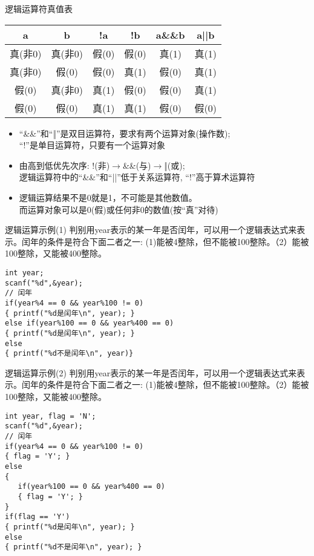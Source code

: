 \begin{frame}{逻辑运算符真值表}
\centering
\begin{tabular}{|c|c||c|c|c|c|}
\hline 
a       & b      & !a    & !b    & a\&\&b & a||b \\ 
\hline 
真(非0) & 真(非0) & 假(0) & 假(0) & 真(1)  & 真(1) \\ 
\hline
真(非0) & 假(0)   & 假(0) & 真(1) & 假(0)  & 真(1) \\ 
\hline 
假(0)   & 真(非0) & 真(1) & 假(0) & 假(0)  & 真(1) \\ 
\hline 
假(0)   & 假(0)   & 真(1) & 真(1) & 假(0)  & 假(0) \\ 
\hline  
\end{tabular} 
\begin{itemize}
	\item ``\&\&''和``‖''是双目运算符，要求有两个运算对象(操作数);\\ ``!''是单目运算符，只要有一个运算对象
	\item 由高到低优先次序: !(非)$\to$\&\&(与)$\to$‖(或);\\
          逻辑运算符中的``\&\&''和``||''低于关系运算符, ``!''高于算术运算符
	\item 逻辑运算结果不是0就是1，不可能是其他数值。\\
	      而运算对象可以是0(假)或任何非0的数值(按``真''对待)
\end{itemize}
\end{frame}

\begin{frame}{逻辑运算示例(1)}
判别用year表示的某一年是否闰年，可以用一个逻辑表达式来表示。闰年的条件是符合下面二者之一: (1)能被4整除，但不能被100整除。（2）能被100整除，又能被400整除。
\begin{lstlisting}
int year;
scanf("%d",&year);
// 闰年
if(year%4 == 0 && year%100 != 0)
{ printf("%d是闰年\n", year); }
else if(year%100 == 0 && year%400 == 0)
{ printf("%d是闰年\n", year); }
else
{ printf("%d不是闰年\n", year)}
\end{lstlisting}
\end{frame}

\begin{frame}{逻辑运算示例(2)}
判别用year表示的某一年是否闰年，可以用一个逻辑表达式来表示。闰年的条件是符合下面二者之一: (1)能被4整除，但不能被100整除。（2）能被100整除，又能被400整除。
\begin{lstlisting}
int year, flag = 'N';
scanf("%d",&year);
// 闰年
if(year%4 == 0 && year%100 != 0)
{ flag = 'Y'; }
else
{ 
   if(year%100 == 0 && year%400 == 0)
   { flag = 'Y'; }
}
if(flag == 'Y') 
{ printf("%d是闰年\n", year); }
else
{ printf("%d不是闰年\n", year); }
\end{lstlisting}
\end{frame}

